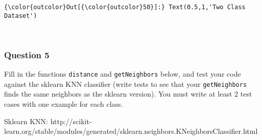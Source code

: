 \documentclass[11pt]{article}
\begin{document}
\begin{Verbatim}[commandchars=\\\{\}]
{\color{outcolor}Out[{\color{outcolor}50}]:} Text(0.5,1,'Two Class Dataset')
\end{Verbatim}
            
    \begin{center}
    \end{center}
    { \hspace*{\fill} \\}
    
    \subsubsection{Question 5}\label{question-5}

Fill in the functions \texttt{distance} and \texttt{getNeighbors} below,
and test your code against the sklearn KNN classifier (write tests to
see that your \texttt{getNeighbors} finds the same neighbors as the
sklearn version). You must write at least 2 test cases with one example
for each class.

Sklearn KNN:
http://scikit-learn.org/stable/modules/generated/sklearn.neighbors.KNeighborsClassifier.html
\end{document}

